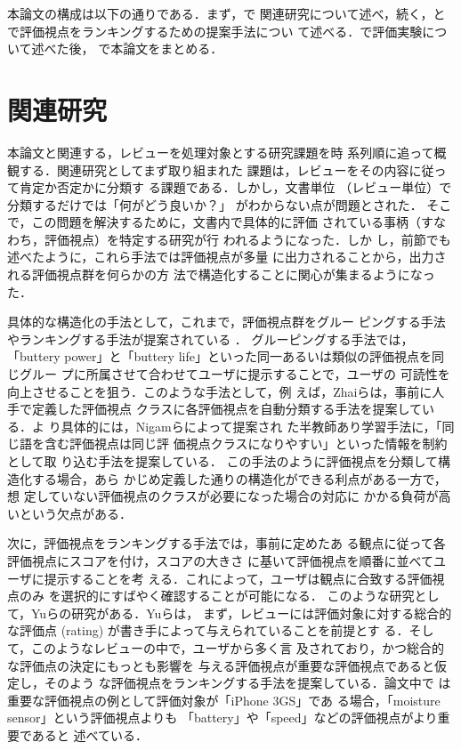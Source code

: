 \documentclass[japanese]{jnlp_1.4}
\def\sec#1{}
\begin{document}
本論文の構成は以下の通りである．まず，\sec{relation}で
関連研究について述べ，続く，\sec{uniq_aspect_ranking}と
\sec{cl}で評価視点をランキングするための提案手法につい
て述べる．\sec{experiment}で評価実験について述べた後，
\sec{owarini}で本論文をまとめる．



\section{関連研究}
\label{sec:relation}

本論文と関連する，レビューを処理対象とする研究課題を時
系列順に追って概観する．関連研究としてまず取り組まれた
課題は，レビューをその内容に従って肯定か否定かに分類す
る課題である\cite{turney,pang,mullen}．しかし，文書単位
（レビュー単位）で分類するだけでは「何がどう良いか？」
がわからない点が問題とされた．
そこで，この問題を解決するために，文書内で具体的に評価
されている事柄（すなわち，評価視点）を特定する研究が行
われるようになった\cite{hu,liu,kobayashi2,jakob}．しか
し，前節でも述べたように，これら手法では評価視点が多量
に出力されることから，出力される評価視点群を何らかの方
法で構造化することに関心が集まるようになった．


具体的な構造化の手法として，これまで，評価視点群をグルー
ピングする手法やランキングする手法が提案されている
\cite{zhai,yu}．
グルーピングする手法では，「buttery power」と「buttery
  life」といった同一あるいは類似の評価視点を同じグルー
プに所属させて合わせてユーザに提示することで，ユーザの
可読性を向上させることを狙う．このような手法として，例
えば，Zhaiら\cite{zhai}は，事前に人手で定義した評価視点
クラスに各評価視点を自動分類する手法を提案している．よ
り具体的には，Nigamら\cite{nigam2000a}によって提案され
た半教師あり学習手法に，「同じ語を含む評価視点は同じ評
  価視点クラスになりやすい」といった情報を制約として取
り込む手法を提案している．
この手法のように評価視点を分類して構造化する場合，あら
かじめ定義した通りの構造化ができる利点がある一方で，想
定していない評価視点のクラスが必要になった場合の対応に
かかる負荷が高いという欠点がある．


次に，評価視点をランキングする手法では，事前に定めたあ
る観点に従って各評価視点にスコアを付け，スコアの大きさ
に基いて評価視点を順番に並べてユーザに提示することを考
える．これによって，ユーザは観点に合致する評価視点のみ
を選択的にすばやく確認することが可能になる．
このような研究として，Yuら\cite{yu}の研究がある．Yuらは，
まず，レビューには評価対象に対する総合的な評価点
(rating) が書き手によって与えられていることを前提とす
る．そして，このようなレビューの中で，ユーザから多く言
及されており，かつ総合的な評価点の決定にもっとも影響を
与える評価視点が重要な評価視点であると仮定し，そのよう
な評価視点をランキングする手法を提案している．論文中で
は重要な評価視点の例として評価対象が「iPhone 3GS」であ
る場合，「moisture sensor」という評価視点よりも
「battery」や「speed」などの評価視点がより重要であると
述べている．
\end{document}
